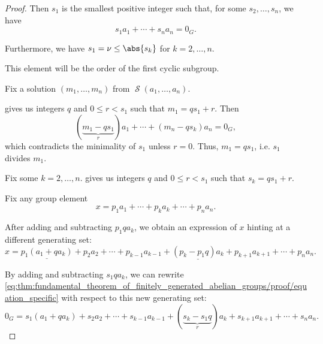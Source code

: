 \begin{proof}
  Then \( s_1 \) is the smallest positive integer such that, for some \( s_2, \ldots, s_n \), we have
  \begin{equation}\label{eq:thm:fundamental_theorem_of_finitely_generated_abelian_groups/proof/equation_specific}
    s_1 a_1 + \cdots + s_n a_n = 0_G.
  \end{equation}

  Furthermore, we have \( s_1 = \nu \leq \abs{s_k} \) for \( k = 2, \ldots, n \).

  This element will be the order of the first cyclic subgroup.

   Fix a solution \( (m_1, \ldots, m_n) \) from \( \mscrS(a_1, \ldots, a_n) \).

   gives us integers \( q \) and \( 0 \leq r < s_1 \) such that \( m_1 = qs_1 + r \). Then
  \begin{equation*}
    (\underbrace{m_1 - q s_1}_r) a_1 + \cdots + (m_n - q s_k) a_n = 0_G,
  \end{equation*}
  which contradicts the minimality of \( s_1 \) unless \( r = 0 \). Thus, \( m_1 = q s_1 \), i.e. \( s_1 \) divides \( m_1 \).

   Fix some \( k = 2, \ldots, n \).  gives us integers \( q \) and \( 0 \leq r < s_1 \) such that \( s_k = q s_1 + r \).

  Fix any group element
  \begin{equation*}
    x = p_1 a_1 + \cdots + p_k a_k + \cdots + p_n a_n.
  \end{equation*}

  After adding and subtracting \( p_1 q a_k \), we obtain an expression of \( x \) hinting at a different generating set:
  \begin{equation*}
    x = \underline{p_1 (a_1 + q a_k)} + p_2 a_2 + \cdots + p_{k-1} a_{k-1} + \underline{(p_k - p_1 q) a_k} + p_{k+1} a_{k+1} + \cdots + p_n a_n.
  \end{equation*}

  By adding and subtracting \( s_1 q a_k \), we can rewrite \eqref{eq:thm:fundamental_theorem_of_finitely_generated_abelian_groups/proof/equation_specific} with respect to this new generating set:
  \begin{equation*}
    0_G = s_1 (a_1 + q a_k) + s_2 a_2 + \cdots + s_{k-1} a_{k-1} + (\underbrace{s_k - s_1 q}_r) a_k + s_{k+1} a_{k+1} + \cdots + s_n a_n.
  \end{equation*}


\end{proof}

